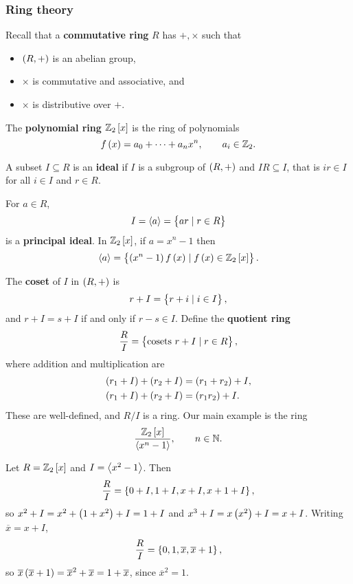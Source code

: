 \subsubsection{Ring theory}

Recall that a \textbf{commutative ring} $ R $ has $ +, \times $ such that
\begin{itemize}
\item $ \br{R, +} $ is an abelian group,
\item $ \times $ is commutative and associative, and
\item $ \times $ is distributive over $ + $.
\end{itemize}

\begin{example*}
The \textbf{polynomial ring} $ \Z_2\sbr{x} $ is the ring of polynomials
$$ f\br{x} = a_0 + \dots + a_nx^n, \qquad a_i \in \Z_2. $$
\end{example*}

A subset $ I \subseteq R $ is an \textbf{ideal} if $ I $ is a subgroup of $ \br{R, +} $ and $ IR \subseteq I $, that is $ ir \in I $ for all $ i \in I $ and $ r \in R $.

\begin{example*}
For $ a \in R $,
$$ I = \abr{a} = \cbr{ar \mid r \in R} $$
is a \textbf{principal ideal}. In $ \Z_2\sbr{x} $, if $ a = x^n - 1 $ then
$$ \abr{a} = \cbr{\br{x^n - 1}f\br{x} \mid f\br{x} \in \Z_2\sbr{x}}. $$
\end{example*}

The \textbf{coset} of $ I $ in $ \br{R, +} $ is
$$ r + I = \cbr{r + i \mid i \in I}, $$
and $ r + I = s + I $ if and only if $ r - s \in I $. Define the \textbf{quotient ring}
$$ \dfrac{R}{I} = \cbr{\text{cosets} \ r + I \mid r \in R}, $$
where addition and multiplication are
\begin{align*}
\br{r_1 + I} + \br{r_2 + I} & = \br{r_1 + r_2} + I, \\
\br{r_1 + I} + \br{r_2 + I} & = \br{r_1r_2} + I.
\end{align*}
These are well-defined, and $ R / I $ is a ring. Our main example is the ring
$$ \dfrac{\Z_2\sbr{x}}{\abr{x^n - 1}}, \qquad n \in \N. $$

\begin{example*}
Let $ R = \Z_2\sbr{x} $ and $ I = \left\langle x^2 - 1 \right\rangle $. Then
$$ \dfrac{R}{I} = \cbr{0 + I, 1 + I, x + I, x + 1 + I}, $$
so $ x^2 + I = x^2 + \br{1 + x^2} + I = 1 + I $ and $ x^3 + I = x\br{x^2} + I = x + I $. Writing $ \overline{x} = x + I $,
$$ \dfrac{R}{I} = \cbr{0, 1, \overline{x}, \overline{x} + 1}, $$
so $ \overline{x}\br{\overline{x} + 1} = \overline{x}^2 + \overline{x} = 1 + \overline{x} $, since $ \overline{x}^2 = 1 $.
\end{example*}

